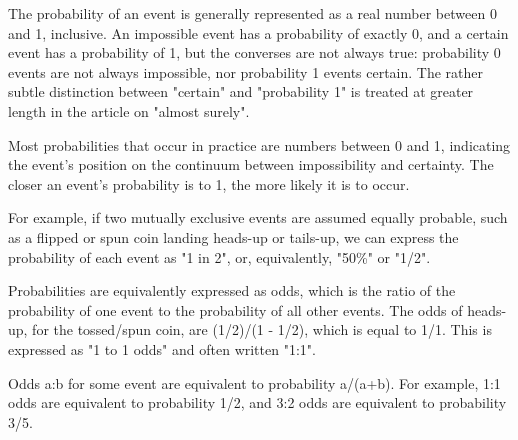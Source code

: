 \documentclass[10pt,a4paper,titlepage,twoside,openright]{report}
\begin{document}
{
The probability of an event is generally represented as a real number between 0 and 1, inclusive. An impossible event has a probability of exactly 0, and a certain event has a probability of 1, but the converses are not always true: probability 0 events are not always impossible, nor probability 1 events certain. The rather subtle distinction between "certain" and "probability 1" is treated at greater length in the article on "almost surely".

Most probabilities that occur in practice are numbers between 0 and 1, indicating the event's position on the continuum between impossibility and certainty. The closer an event's probability is to 1, the more likely it is to occur.

For example, if two mutually exclusive events are assumed equally probable, such as a flipped or spun coin landing heads-up or tails-up, we can express the probability of each event as "1 in 2", or, equivalently, "50\%" or "1/2".

Probabilities are equivalently expressed as odds, which is the ratio of the probability of one event to the probability of all other events. The odds of heads-up, for the tossed/spun coin, are (1/2)/(1 - 1/2), which is equal to 1/1. This is expressed as "1 to 1 odds" and often written "1:1".

Odds a:b for some event are equivalent to probability a/(a+b). For example, 1:1 odds are equivalent to probability 1/2, and 3:2 odds are equivalent to probability 3/5.
}
\end{document}
